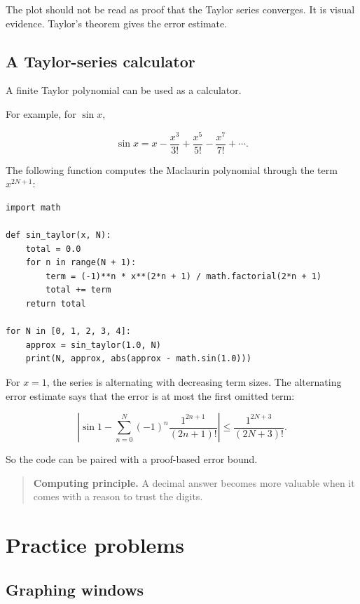 The plot should not be read as proof that the Taylor series converges.  It is visual
evidence.  Taylor's theorem gives the error estimate.

\subsection{A Taylor-series calculator}
\label{appsubsec:taylor-series-calculator}

A finite Taylor polynomial can be used as a calculator.

For example, for \(\sin x\),

\[
\sin x
=
x-\frac{x^3}{3!}+\frac{x^5}{5!}-\frac{x^7}{7!}+\cdots.
\]

The following function computes the Maclaurin polynomial through the term
\(x^{2N+1}\):

\begin{verbatim}
import math

def sin_taylor(x, N):
    total = 0.0
    for n in range(N + 1):
        term = (-1)**n * x**(2*n + 1) / math.factorial(2*n + 1)
        total += term
    return total

for N in [0, 1, 2, 3, 4]:
    approx = sin_taylor(1.0, N)
    print(N, approx, abs(approx - math.sin(1.0)))
\end{verbatim}

For \(x=1\), the series is alternating with decreasing term sizes.  The alternating error
estimate says that the error is at most the first omitted term:

\[
\left|\sin 1-\sum_{n=0}^{N}(-1)^n\frac{1^{2n+1}}{(2n+1)!}\right|
\le
\frac{1^{2N+3}}{(2N+3)!}.
\]

So the code can be paired with a proof-based error bound.

\begin{quote}
\textbf{Computing principle.}
A decimal answer becomes more valuable when it comes with a reason to trust the
digits.
\end{quote}

\section{Practice problems}
\label{appsec:technology-practice-problems}

\subsection*{Graphing windows}

